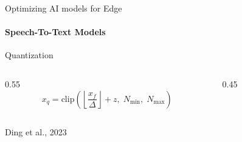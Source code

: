 \begin{frame}{Optimizing AI models for Edge}
\framesubtitle{Speech-To-Text Models}

\begin{block}{Quantization}

\begin{columns}[c,onlytextwidth]

\begin{column}{0.55\textwidth}
    \centering
    \[
    x_q = \mathrm{clip}\left(\left\lfloor \frac{x_f}{\Delta} \right\rfloor + z,\; N_{\min},\; N_{\max}\right)
    \]
\end{column}

\begin{column}{0.45\textwidth}
\centering

\small
\setlength{\tabcolsep}{4pt}
\renewcommand{\arraystretch}{1.2}

\end{column}

\end{columns}
\end{block}
\begin{flushleft}
\tiny Ding et al., 2023
\end{flushleft}
\end{frame}